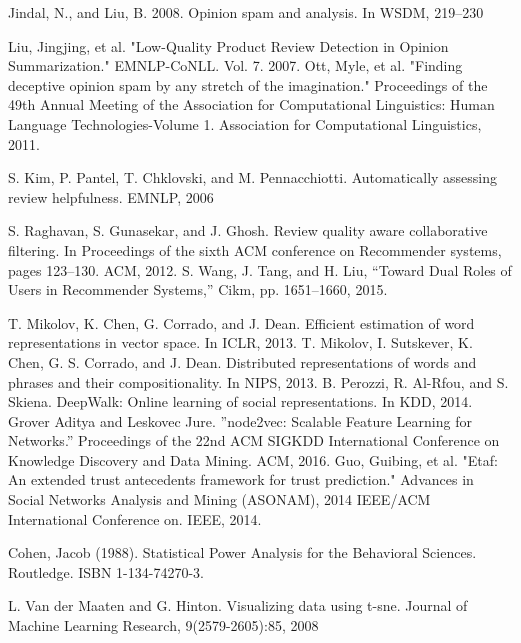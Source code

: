 \documentclass[master,english,final]{kaist-ucs}
\begin{document}
\begin{thebibliography}{00}
 Jindal, N., and Liu, B. 2008. Opinion spam and analysis. In WSDM, 219–230

 Liu, Jingjing, et al. "Low-Quality Product Review Detection in Opinion Summarization." EMNLP-CoNLL. Vol. 7. 2007.
 Ott, Myle, et al. "Finding deceptive opinion spam by any stretch of the imagination." Proceedings of the 49th Annual Meeting of the Association for Computational Linguistics: Human Language Technologies-Volume 1. Association for Computational Linguistics, 2011.

 S. Kim, P. Pantel, T. Chklovski, and M. Pennacchiotti. Automatically assessing review helpfulness. EMNLP, 2006

 S. Raghavan, S. Gunasekar, and J. Ghosh. Review quality aware collaborative filtering. In Proceedings of the sixth ACM conference on Recommender systems, pages 123–130. ACM, 2012.
 S. Wang, J. Tang, and H. Liu, “Toward Dual Roles of Users in Recommender Systems,” Cikm, pp. 1651–1660, 2015.


 T. Mikolov, K. Chen, G. Corrado, and J. Dean. Efficient estimation of word representations in vector space. In ICLR, 2013.
 T. Mikolov, I. Sutskever, K. Chen, G. S. Corrado, and J. Dean. Distributed representations of words and phrases and their compositionality. In NIPS, 2013.
 B. Perozzi, R. Al-Rfou, and S. Skiena. DeepWalk: Online learning of social representations. In KDD, 2014.
 Grover Aditya and  Leskovec Jure. ”node2vec: Scalable Feature Learning for Networks.” Proceedings of the 22nd ACM SIGKDD International Conference on Knowledge Discovery and Data Mining. ACM, 2016.
 Guo, Guibing, et al. "Etaf: An extended trust antecedents framework for trust prediction." Advances in Social Networks Analysis and Mining (ASONAM), 2014 IEEE/ACM International Conference on. IEEE, 2014.

  Cohen, Jacob (1988). Statistical Power Analysis for the Behavioral Sciences. Routledge. ISBN 1-134-74270-3.

 L. Van der Maaten and G. Hinton. Visualizing data using t-sne. Journal of Machine Learning Research, 9(2579-2605):85, 2008

\end{thebibliography}
\end{document}
